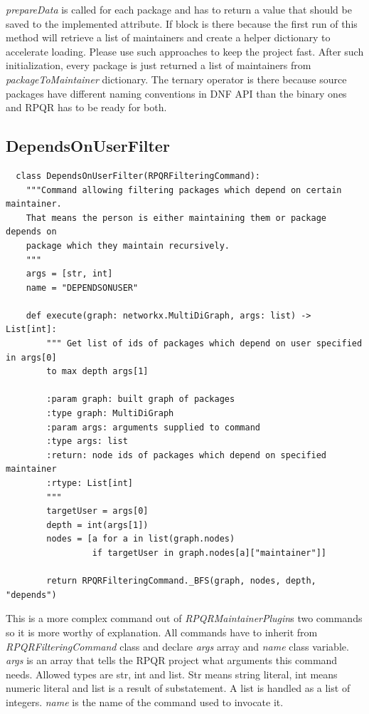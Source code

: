 \textit{prepareData} is called for each package and has to return a value that should be
saved to the implemented attribute. If block is there because the first run of this method will retrieve
a list of maintainers and create a helper dictionary to accelerate loading. Please use such approaches
to keep the project fast. After such initialization, every package is just returned a list of maintainers
from \textit{packageToMaintainer} dictionary. The ternary operator is there because source packages
have different naming conventions in DNF API than the binary ones and RPQR has to be ready for both.

\newpage

\subsection*{DependsOnUserFilter}

\begin{lstlisting}
  class DependsOnUserFilter(RPQRFilteringCommand):
    """Command allowing filtering packages which depend on certain maintainer.
    That means the person is either maintaining them or package depends on
    package which they maintain recursively.
    """
    args = [str, int]
    name = "DEPENDSONUSER"

    def execute(graph: networkx.MultiDiGraph, args: list) -> List[int]:
        """ Get list of ids of packages which depend on user specified in args[0]
        to max depth args[1]

        :param graph: built graph of packages
        :type graph: MultiDiGraph
        :param args: arguments supplied to command
        :type args: list
        :return: node ids of packages which depend on specified maintainer
        :rtype: List[int]
        """
        targetUser = args[0]
        depth = int(args[1])
        nodes = [a for a in list(graph.nodes)
                 if targetUser in graph.nodes[a]["maintainer"]]

        return RPQRFilteringCommand._BFS(graph, nodes, depth, "depends")
\end{lstlisting}

This is a more complex command out of \textit{RPQRMaintainerPlugin}s two commands so it is more worthy of
explanation. All commands have to inherit from \textit{RPQRFilteringCommand} class and declare \textit{args}
array and \textit{name} class variable. \textit{args} is an array that tells the RPQR project what arguments
this command needs. Allowed types are str, int and list. Str means string literal, int means numeric
literal and list is a result of substatement. A list is handled as a list of integers. \textit{name}
is the name of the command used to invocate it.

